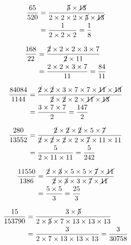{{\item\begin{align*}
    \frac{65}{520} &=
    \frac{\cancel{5} \times \cancel{13}}
    {2 \times 2 \times 2 \times \cancel{5} \times \cancel{13}}\\ &=
    \frac{1}
    {2 \times 2 \times 2} =
    \frac{1}{8}
    \end{align*}

\item\begin{align*}
    \frac{168}{22} &=
    \frac{\cancel{2} \times 2 \times 2 \times 3 \times 7}
    {\cancel{2} \times 11}\\ &=
    \frac{2 \times 2 \times 3 \times 7}
    {11} =
    \frac{84}{11}
    \end{align*}

\item\begin{align*}
    \frac{84084}{1144} &=
    \frac{\cancel{2} \times \cancel{2} \times 3 \times 7 \times 7 \times \cancel{11} \times \cancel{13}}
    {\cancel{2} \times \cancel{2} \times 2 \times \cancel{11} \times \cancel{13}}\\ &=
    \frac{3 \times 7 \times 7}
    {2} =
    \frac{147}{2}
    \end{align*}

\item\begin{align*}
    \frac{280}{13552} &=
    \frac{\cancel{2} \times \cancel{2} \times \cancel{2} \times 5 \times \cancel{7}}
    {\cancel{2} \times \cancel{2} \times \cancel{2} \times 2 \times \cancel{7} \times 11 \times 11}\\ &=
    \frac{5}
    {2 \times 11 \times 11} =
    \frac{5}{242}
    \end{align*}

\item\begin{align*}
    \frac{11550}{1386} &=
    \frac{\cancel{2} \times \cancel{3} \times 5 \times 5 \times \cancel{7} \times \cancel{11}}
    {\cancel{2} \times \cancel{3} \times 3 \times \cancel{7} \times \cancel{11}}\\ &=
    \frac{5 \times 5}
    {3} =
    \frac{25}{3}
    \end{align*}

\item\begin{align*}
    \frac{15}{153790} &=
    \frac{3 \times \cancel{5}}
    {2 \times \cancel{5} \times 7 \times 13 \times 13 \times 13}\\ &=
    \frac{3}
    {2 \times 7 \times 13 \times 13 \times 13} =
    \frac{3}{30758}
    \end{align*}

}}
